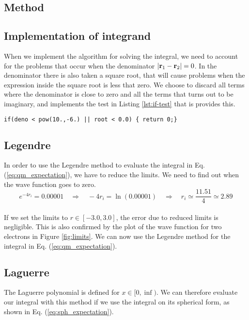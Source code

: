 \documentclass[12pt]{article}
\begin{document}
\begin{flushleft}
\section{Method}
\subsection{Implementation of integrand}
When we implement the algorithm for solving the integral, we need to account for the problems that occur when the denominator $|{\bf r}_1-{\bf r}_2| = 0$. In the denominator there is also taken a square root, that will cause problems when the expression inside the square root is less that zero. We choose to discard all terms where the denominator is close to zero and all the terms that turns out to be imaginary, and implements the test in Listing \ref{lst:if-test} that is provides this.

\begin{center}
  \lstset{%
    caption=If-test that checks if the denominator in the integrand evaluated is close to zero or if the integrand turns out to be imaginary.,
    basicstyle=\ttfamily\footnotesize\bfseries,
    frame=tb
  }
\begin{lstlisting}[label={lst:if-test}]
   if(deno < pow(10.,-6.) || root < 0.0) { return 0;}
\end{lstlisting}
\end{center}

\subsection{Legendre}
In order to use the Legendre method to evaluate the integral in Eq. (\ref{eq:qm_expectation}), we have to reduce the limits. We need to find out when the wave function goes to zero.
\vspace{5mm}
$$e^{-4r_i} = 0.00001 \quad\Rightarrow\quad -4r_i = \ln(0.00001) \quad\Rightarrow\quad r_i \simeq \frac{11.51}{4}\simeq 2.89$$\\
\vspace{5mm}
If we set the limits to $r\in [-3.0,3.0]$, the error due to reduced limits is negligible. This is also confirmed by the plot of the wave function for two electrons in Figure \ref{fig:limits}. We can now use the Legendre method for the integral in Eq. (\ref{eq:qm_expectation}).

\subsection{Laguerre}
The Laguerre polynomial is defined for $x\in [0,\inf)$. We can therefore evaluate our integral with this method if we use the integral on its spherical form, as shown in Eq. (\ref{eq:sph_expectation}).


\end{flushleft}
\end{document}
